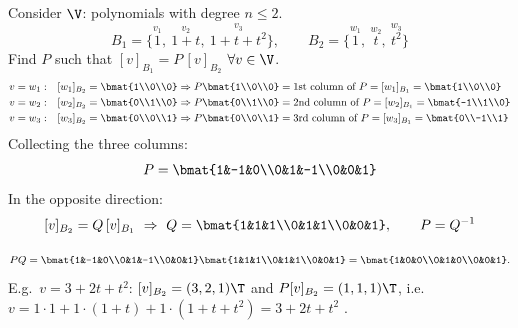 \begin{example}
Consider $\V$: polynomials with degree $n\le2$.
\[
B_1 = \{\overset{v_1}{1},\ \overset{v_2}{1+t},\ \overset{v_3}{1+t+t^2}\},
\qquad
B_2 = \{\overset{w_1}{1},\ \overset{w_2}{t},\ \overset{w_3}{t^2}\}
\]
Find $P$ such that $[v]_{B_1} = P\,[v]_{B_2}$ $\forall v\in\V$.
\begin{align*}
v=w_1:&\quad [w_1]_{B_2} = \bmat{1\\0\\0} \Rightarrow P\bmat{1\\0\\0} = \text{1st column of } P = [w_1]_{B_1} = \bmat{1\\0\\0}\\
v=w_2:&\quad [w_2]_{B_2} = \bmat{0\\1\\0} \Rightarrow P\bmat{0\\1\\0} = \text{2nd column of } P = [w_2]_{B_1} = \bmat{-1\\1\\0}\\
v=w_3:&\quad [w_3]_{B_2} = \bmat{0\\0\\1} \Rightarrow P\bmat{0\\0\\1} = \text{3rd column of } P = [w_3]_{B_1} = \bmat{0\\-1\\1}
\end{align*}
 Collecting the three columns:
\[
P = \bmat{1&-1&0\\0&1&-1\\0&0&1}
\]
In the opposite direction:
\[
[v]_{B_2} = Q\,[v]_{B_1} \ \Rightarrow\ Q = \bmat{1&1&1\\0&1&1\\0&0&1}, \qquad P = Q^{-1}
\]
\begin{insight}[Check]
\[
PQ=\bmat{1&-1&0\\0&1&-1\\0&0&1}\bmat{1&1&1\\0&1&1\\0&0&1}=\bmat{1&0&0\\0&1&0\\0&0&1}.
\]
E.g.\ $v=3+2t+t^2$: $[v]_{B_2}=(3,2,1)\T$ and $P[v]_{B_2}=(1,1,1)\T$, i.e.\ $v=1\cdot1+1\cdot(1+t)+1\cdot(1+t+t^2)=3+2t+t^2$ \checkmark.
\end{insight}
\end{example}

